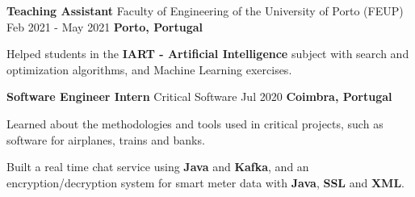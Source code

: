\begin{cventries}
  \cventry
     {\textbf{Teaching Assistant}} %
    {Faculty of Engineering of the University of Porto (FEUP) \href{https://sigarra.up.pt/feup/pt/web_page.inicial}{\faExternalLink}} %
    {Feb 2021 - May 2021} %
    {\textbf{Porto, Portugal}} %
    {
      \begin{cvitems} %
        \item {Helped students in the \textbf{IART - Artificial Intelligence} subject with search and optimization algorithms, and Machine Learning exercises.}
      \end{cvitems}
    }


  \cventry
    {\textbf{Software Engineer Intern}} %
    {Critical Software \href{https://www.criticalsoftware.com/en}{\faExternalLink}} %
    {Jul 2020} %
    {\textbf{Coimbra, Portugal}} %
    {
      \begin{cvitems} %
        \item {Learned about the methodologies and tools used in critical projects, such as software for airplanes, trains and banks.}
        \item {Built a real time chat service using \textbf{Java} and \textbf{Kafka}, and an encryption/decryption system for smart meter data with \textbf{Java}, \textbf{SSL} and \textbf{XML}.}
      \end{cvitems}
    }




\end{cventries}
